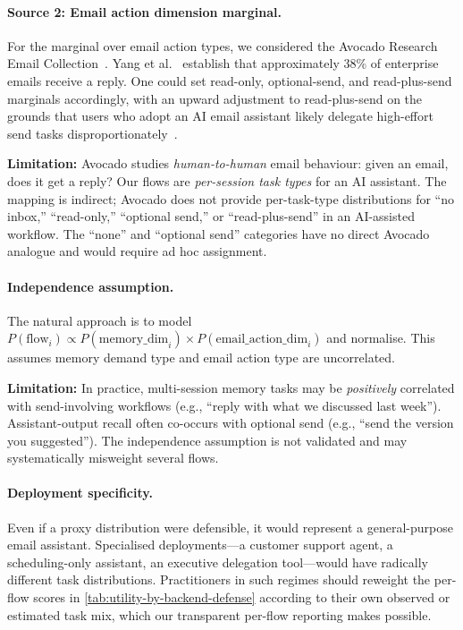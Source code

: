 \paragraph{Source 2: Email action dimension marginal.}
For the marginal over email action types, we considered the Avocado Research Email Collection~\citep{avocado2015}. Yang et al.~\citep{yang2017sigir} establish that approximately 38\% of enterprise emails receive a reply. One could set read-only, optional-send, and read-plus-send marginals accordingly, with an upward adjustment to read-plus-send on the grounds that users who adopt an AI email assistant likely delegate high-effort send tasks disproportionately~\citep{chi2025email}.

\textbf{Limitation:} Avocado studies \emph{human-to-human} email behaviour: given an email, does it get a reply? Our flows are \emph{per-session task types} for an AI assistant. The mapping is indirect; Avocado does not provide per-task-type distributions for ``no inbox,'' ``read-only,'' ``optional send,'' or ``read-plus-send'' in an AI-assisted workflow. The ``none'' and ``optional send'' categories have no direct Avocado analogue and would require ad hoc assignment.

\paragraph{Independence assumption.}
The natural approach is to model $P(\text{flow}_i) \propto P(\text{memory\_dim}_i) \times P(\text{email\_action\_dim}_i)$ and normalise. This assumes memory demand type and email action type are uncorrelated.

\textbf{Limitation:} In practice, multi-session memory tasks may be \emph{positively} correlated with send-involving workflows (e.g., ``reply with what we discussed last week''). Assistant-output recall often co-occurs with optional send (e.g., ``send the version you suggested''). The independence assumption is not validated and may systematically misweight several flows.

\paragraph{Deployment specificity.}
Even if a proxy distribution were defensible, it would represent a general-purpose email assistant. Specialised deployments---a customer support agent, a scheduling-only assistant, an executive delegation tool---would have radically different task distributions. Practitioners in such regimes should reweight the per-flow scores in \cref{tab:utility-by-backend-defense} according to their own observed or estimated task mix, which our transparent per-flow reporting makes possible.

